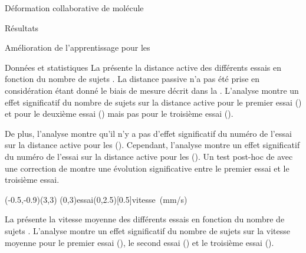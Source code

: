 \documentclass[myfrancais]{mythesis}
\begin{document}
\begin{mychapter}{Déformation collaborative de molécule}
\begin{mysection}{Résultats}
\begin{mysubsection}{Amélioration de l'apprentissage pour les }
\begin{mysubsubsection}{Données et statistiques}
					La  présente la distance active  des différents essais  en fonction du nombre de sujets .
					La distance passive n'a pas été prise en considération étant donné le biais de mesure décrit dans la .
					L'analyse montre un effet significatif du nombre de sujets  sur la distance active  pour le premier essai () et pour le deuxième essai () mais pas pour le troisième essai ().

					De plus, l'analyse montre qu'il n'y a pas d'effet significatif du numéro de l'essai  sur la distance active  pour les  ().
					Cependant, l'analyse montre un effet significatif du numéro de l'essai  sur la distance active  pour les  ().
					Un test post-hoc de  avec une correction de  montre une évolution significative entre le premier essai et le troisième essai.

					\begin{myfigure}
						\begin{myps}(-0.5,-0.9)(3,3)
							\myaxes(0,3){essai}(0,2.5)[0.5]{vitesse~(mm/s)}
						\end{myps}
					\end{myfigure}

					La  présente la vitesse moyenne  des différents essais  en fonction du nombre de sujets .
					L'analyse montre un effet significatif du nombre de sujets  sur la vitesse moyenne  pour le premier essai (), le second essai () et le troisième essai ().


\end{mysubsubsection}
\end{mysubsection}
\end{mysection}
\end{mychapter}
\end{document}
